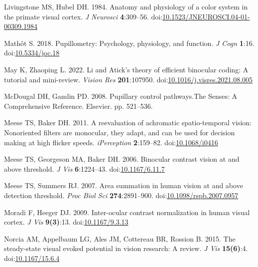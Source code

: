 \documentclass[
]{article}
\newlength{\cslhangindent}
\newlength{\cslentryspacingunit} %
\newenvironment{CSLReferences}[2] %
 {%
  \setlength{\parindent}{0pt}
  \ifodd #1
  \let\oldpar\par
  \def\par{\hangindent=\cslhangindent\oldpar}
  \fi
  \setlength{\parskip}{#2\cslentryspacingunit}
 }%
 {}
\begin{document}
\begin{CSLReferences}{1}{0}
\leavevmode{}%
Livingstone MS, Hubel DH. 1984. Anatomy and physiology of a color system in the primate visual cortex. \emph{J Neurosci} \textbf{4}:309--56. doi:\href{https://doi.org/10.1523/JNEUROSCI.04-01-00309.1984}{10.1523/JNEUROSCI.04-01-00309.1984}

\leavevmode{}%
Mathôt S. 2018. Pupillometry: Psychology, physiology, and function. \emph{J Cogn} \textbf{1}:16. doi:\href{https://doi.org/10.5334/joc.18}{10.5334/joc.18}

\leavevmode{}%
May K, Zhaoping L. 2022. Li and {Atick's} theory of efficient binocular coding: A tutorial and mini-review. \emph{Vision Res} \textbf{201}:107950. doi:\href{https://doi.org/10.1016/j.visres.2021.08.005}{10.1016/j.visres.2021.08.005}

\leavevmode{}%
McDougal DH, Gamlin PD. 2008. Pupillary control pathways.The Senses: A Comprehensive Reference. Elsevier. pp. 521--536.

\leavevmode{}%
Meese TS, Baker DH. 2011. A reevaluation of achromatic spatio-temporal vision: Nonoriented filters are monocular, they adapt, and can be used for decision making at high flicker speeds. \emph{{iPerception}} \textbf{2}:159--82. doi:\href{https://doi.org/10.1068/i0416}{10.1068/i0416}

\leavevmode{}%
Meese TS, Georgeson MA, Baker DH. 2006. Binocular contrast vision at and above threshold. \emph{J Vis} \textbf{6}:1224--43. doi:\href{https://doi.org/10.1167/6.11.7}{10.1167/6.11.7}

\leavevmode{}%
Meese TS, Summers RJ. 2007. Area summation in human vision at and above detection threshold. \emph{Proc Biol Sci} \textbf{274}:2891--900. doi:\href{https://doi.org/10.1098/rspb.2007.0957}{10.1098/rspb.2007.0957}

\leavevmode{}%
Moradi F, Heeger DJ. 2009. Inter-ocular contrast normalization in human visual cortex. \emph{J Vis} \textbf{9(3)}:13. doi:\href{https://doi.org/10.1167/9.3.13}{10.1167/9.3.13}

\leavevmode{}%
Norcia AM, Appelbaum LG, Ales JM, Cottereau BR, Rossion B. 2015. The steady-state visual evoked potential in vision research: A review. \emph{J Vis} \textbf{15(6)}:4. doi:\href{https://doi.org/10.1167/15.6.4}{10.1167/15.6.4}


\end{CSLReferences}
\end{document}
